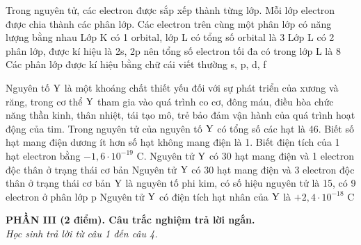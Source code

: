 \documentclass[11pt,a4paper]{article}
\begin{document}
\begin{ex}
Trong nguyên tử, các electron được sắp xếp thành từng lớp. Mỗi lớp electron được chia thành các phân lớp.
\choiceTF
{\True Các electron trên cùng một phân lớp có năng lượng bằng nhau}
{Lớp K có 1 orbital, lớp L có tổng số orbital là 3}
{\True Lớp L có 2 phân lớp, được kí hiệu là 2s, 2p nên tổng số electron tối đa có trong lớp L là 8}
{\True Các phân lớp được kí hiệu bằng chữ cái viết thường s, p, d, f}
\end{ex}
\begin{ex}
Nguyên tố $\ce{Y}$ là một khoáng chất thiết yếu đối với sự phát triển của xương và răng, trong cơ thể $\ce{Y}$ tham gia vào quá trình co cơ, đông máu, điều hòa chức năng thần kinh, thân nhiệt, tái tạo mô, trẻ bảo đảm vận hành của quá trình hoạt động của tim. Trong nguyên tử của nguyên tố $\ce{Y}$ có tổng số các hạt là 46. Biết số hạt mang điện dương ít hơn số hạt không mang điện là 1. Biết điện tích của 1 hạt electron bằng $-1,6 \cdot 10^{-19}\text{ C}$.
\choiceTF
{Nguyên tử $\ce{Y}$ có 30 hạt mang điện và 1 electron độc thân ở trạng thái cơ bản}
{\True Nguyên tử $\ce{Y}$ có 30 hạt mang điện và 3 electron độc thân ở trạng thái cơ bản}
{\True $\ce{Y}$ là nguyên tố phi kim, có số hiệu nguyên tử là 15, có 9 electron ở phân lớp p}
{\True Nguyên tử $\ce{Y}$ có điện tích hạt nhân của $\ce{Y}$ là $+2,4 \cdot 10^{-18}\text{ C}$}
\end{ex}
\vspace{4pt}
\noindent
{\color{mainGreen}\textbf{\Large PHẦN III (2 điểm). Câu trắc nghiệm trả lời ngắn.}}\\
\textit{\small Học sinh trả lời từ câu 1 đến câu 4.}
\vspace{2pt}
\end{document}
